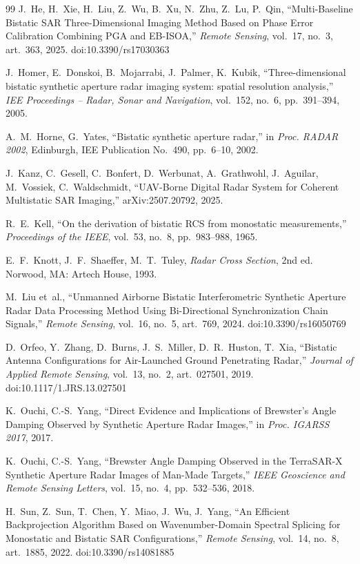 \documentclass[11pt,a4paper]{report}
\begin{document}
\begin{thebibliography}{99}
 J.~He, H.~Xie, H.~Liu, Z.~Wu, B.~Xu, N.~Zhu, Z.~Lu, P.~Qin, ``Multi-Baseline Bistatic SAR Three-Dimensional Imaging Method Based on Phase Error Calibration Combining PGA and EB-ISOA,'' \emph{Remote Sensing}, vol.~17, no.~3, art.~363, 2025. doi:10.3390/rs17030363

 J.~Homer, E.~Donskoi, B.~Mojarrabi, J.~Palmer, K.~Kubik, ``Three-dimensional bistatic synthetic aperture radar imaging system: spatial resolution analysis,'' \emph{IEE Proceedings -- Radar, Sonar and Navigation}, vol.~152, no.~6, pp.~391--394, 2005.

 A.~M.~Horne, G.~Yates, ``Bistatic synthetic aperture radar,'' in \emph{Proc. RADAR 2002}, Edinburgh, IEE Publication No.~490, pp.~6--10, 2002.

 J.~Kanz, C.~Gesell, C.~Bonfert, D.~Werbunat, A.~Grathwohl, J.~Aguilar, M.~Vossiek, C.~Waldschmidt, ``UAV-Borne Digital Radar System for Coherent Multistatic SAR Imaging,'' arXiv:2507.20792, 2025.

 R.~E.~Kell, ``On the derivation of bistatic RCS from monostatic measurements,'' \emph{Proceedings of the IEEE}, vol.~53, no.~8, pp.~983--988, 1965.

 E.~F.~Knott, J.~F.~Shaeffer, M.~T.~Tuley, \emph{Radar Cross Section}, 2nd ed. Norwood, MA: Artech House, 1993.

 M.~Liu et~al., ``Unmanned Airborne Bistatic Interferometric Synthetic Aperture Radar Data Processing Method Using Bi-Directional Synchronization Chain Signals,'' \emph{Remote Sensing}, vol.~16, no.~5, art.~769, 2024. doi:10.3390/rs16050769

 D.~Orfeo, Y.~Zhang, D.~Burns, J.~S.~Miller, D.~R.~Huston, T.~Xia, ``Bistatic Antenna Configurations for Air-Launched Ground Penetrating Radar,'' \emph{Journal of Applied Remote Sensing}, vol.~13, no.~2, art.~027501, 2019. doi:10.1117/1.JRS.13.027501

 K.~Ouchi, C.-S.~Yang, ``Direct Evidence and Implications of Brewster's Angle Damping Observed by Synthetic Aperture Radar Images,'' in \emph{Proc. IGARSS 2017}, 2017.

 K.~Ouchi, C.-S.~Yang, ``Brewster Angle Damping Observed in the TerraSAR-X Synthetic Aperture Radar Images of Man-Made Targets,'' \emph{IEEE Geoscience and Remote Sensing Letters}, vol.~15, no.~4, pp.~532--536, 2018.

 H.~Sun, Z.~Sun, T.~Chen, Y.~Miao, J.~Wu, J.~Yang, ``An Efficient Backprojection Algorithm Based on Wavenumber-Domain Spectral Splicing for Monostatic and Bistatic SAR Configurations,'' \emph{Remote Sensing}, vol.~14, no.~8, art.~1885, 2022. doi:10.3390/rs14081885


\end{thebibliography}
\end{document}

